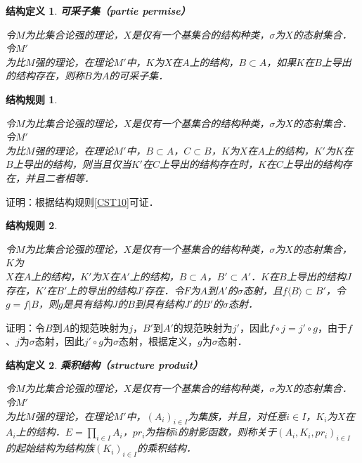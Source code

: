 \documentclass[12pt, a4paper, oneside]{book}
\newtheorem{STdef}{结构定义}
\newtheorem{CST}{结构规则}
\begin{document}
			\begin{STdef}
				\textbf{可采子集（partie permise）}
				\par
				令$M$为比集合论强的理论，$X$是仅有一个基集合的结构种类，$\sigma$为$X$的态射集合．令$M'$\\为比$M$强的理论，在理论$M'$中，$K$为$X$在$A$上的结构，$B\subset A$，如果$K$在$B$上导出的结构存在，则称$B$为$A$的可采子集．
			\end{STdef}
			
			\begin{CST}\label{CST11}
				\hfill\par
				令$M$为比集合论强的理论，$X$是仅有一个基集合的结构种类，$\sigma$为$X$的态射集合．令$M'$\\为比$M$强的理论，在理论$M'$中，$B\subset A$，$C\subset B$，$K$为$X$在$A$上的结构，$K'$为$K$在$B$上导出的结构，则当且仅当$K'$在$C$上导出的结构存在时，$K$在$C$上导出的结构存在，并且二者相等．
			\end{CST}
			证明：根据结构规则\ref{CST10}可证．
			
			\begin{CST}\label{CST12}
				\hfill\par
				令$M$为比集合论强的理论，$X$是仅有一个基集合的结构种类，$\sigma$为$X$的态射集合，$K$为\\$X$在$A$上的结构，$K'$为$X$在$A'$上的结构，$B\subset A$，$B'\subset A'$．$K$在$B$上导出的结构$J$存在，$K'$在$B'$上的导出的结构$J'$存在．令$F$为$A$到$A'$的$\sigma$态射，且$f\langle B\rangle \subset B'$，令$g=f|B$，则$g$是具有结构$J$的$B$到具有结构$J'$的$B'$的$\sigma$态射．
			\end{CST}
			证明：令$B$到$A$的规范映射为$j$，$B'$到$A'$的规范映射为$j'$，因此$f\circ j=j'\circ g$，由于$f$、$j$为$\sigma$态射，因此$j'\circ g$为$\sigma$态射，根据定义，$g$为$\sigma$态射．

			\begin{STdef}
				\textbf{乘积结构（structure produit）}
				\par
				令$M$为比集合论强的理论，$X$是仅有一个基集合的结构种类，$\sigma$为$X$的态射集合．令$M'$\\为比$M$强的理论，在理论$M'$中，$(A_i)_{i\in I}$为集族，并且，对任意$i\in I$，$K_i$为$X$在$A_i$上的结构．$E=\prod\limits_{i\in I}A_i$，$pr_i$为指标$i$的射影函数，则称关于$(A_i, K_i, pr_i)_{i\in I}$的起始结构为结构族$(K_i)_{i\in I}$的乘积结构．
			\end{STdef}
						
\end{document}
